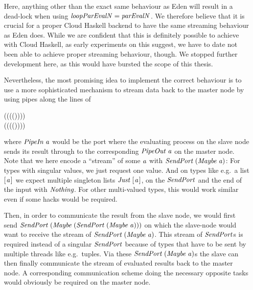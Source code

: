 \documentclass[paper=A4,twoside=true,openright,parskip=full,chapterprefix=true,headings=normal,bibliography=totoc,listof=totoc,titlepage=on,captions=tableabove,draft=false,british]{scrreprt}%
\renewcommand{\enquote}[1]{{``}#1{''}}
\begin{document}
Here, anything other than the exact same behaviour as Eden will result
in a dead-lock when using \ensuremath{\Varid{loopParEvalN}\mathrel{=}\Varid{parEvalN}}. We therefore
believe that it is crucial for a proper Cloud Haskell backend to have
the same streaming behaviour as Eden does. While we are confident that
this is definitely possible to achieve with Cloud Haskell, as early
experiments on this suggest, we have to date not been able to achieve
proper streaming behaviour, though. We stopped further development here,
as this would have bursted the scope of this thesis.

Nevertheless, the most promising idea to implement the correct behaviour
is to use a more sophisticated mechanism to stream data back to the
master node by using pipes along the lines of


\begin{hscode}\SaveRestoreHook
{}%
%
\>[B]{}\;\;\mathrel{=}\;(\;(\;(\;(\;)))){}\<[E]%
\\
\>[B]{}\;\;\mathrel{=}\;(\;(\;(\;(\;)))){}\<[E]%
\ColumnHook
\end{hscode}\resethooks
\vspace{-2\baselineskip}

where \ensuremath{\Conid{PipeIn}\;\Varid{a}} would be the port where the evaluating process on the
slave node sends its result through to the corresponding \ensuremath{\Conid{PipeOut}\;\Varid{a}} on
the master node. Note that we here encode a \enquote{stream} of some \ensuremath{\Varid{a}}
with \ensuremath{\Conid{SendPort}\;(\Conid{Maybe}\;\Varid{a})}: For types with singular values, we just
request one value. And on types like e.g.~a list \ensuremath{[\mskip1.5mu \Varid{a}\mskip1.5mu]} we expect
multiple singleton lists \ensuremath{\Conid{Just}\;[\mskip1.5mu \Varid{a}\mskip1.5mu]}, on the \ensuremath{\Conid{SendPort}} and the end of
the input with \ensuremath{\Conid{Nothing}}. For other multi-valued types, this would work
similar even if some hacks would be required.

Then, in order to communicate the result from the slave node, we would
first send \ensuremath{\Conid{SendPort}\;(\Conid{Maybe}\;(\Conid{SendPort}\;(\Conid{Maybe}\;\Varid{a})))} on which the
slave-node would want to receive the stream of \ensuremath{\Conid{SendPort}\;(\Conid{Maybe}\;\Varid{a})}.
This stream of \ensuremath{\Conid{SendPort}}s is required instead of a singular \ensuremath{\Conid{SendPort}}
because of types that have to be sent by multiple threads like
e.g.~tuples. Via these \ensuremath{\Conid{SendPort}\;(\Conid{Maybe}\;\Varid{a})}s the slave can then finally
communicate the stream of evaluated results back to the master node. A
corresponding communication scheme doing the necessary opposite tasks
would obviously be required on the master node.
\end{document}
